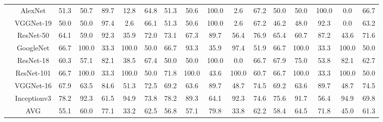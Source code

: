 \documentclass[12pt,italian]{article}
\begin{document}
\begin{tiny}
\begin{longtable}{lcccccccccccccccc}
& AlexNet & 51.3 & 50.7 & 89.7 & 12.8 & 64.8 & 51.3 & 50.6 & 100.0 &  2.6 & 67.2 & 50.0 & 50.0 & 100.0 &  0.0 & 66.7 \\ 
& VGGNet-19 & 50.0 & 50.0 & 97.4 &  2.6 & 66.1 & 51.3 & 50.6 & 100.0 &  2.6 & 67.2 & 46.2 & 48.0 & 92.3 &  0.0 & 63.2 \\ 
& ResNet-50 & 64.1 & 59.0 & 92.3 & 35.9 & 72.0 & 73.1 & 67.3 & 89.7 & 56.4 & 76.9 & 65.4 & 60.7 & 87.2 & 43.6 & 71.6 \\ 
& GoogleNet & 66.7 & 100.0 & 33.3 & 100.0 & 50.0 & 66.7 & 93.3 & 35.9 & 97.4 & 51.9 & 66.7 & 100.0 & 33.3 & 100.0 & 50.0 \\ 
& ResNet-18 & 60.3 & 57.1 & 82.1 & 38.5 & 67.4 & 50.0 & 50.0 & 100.0 &  0.0 & 66.7 & 67.9 & 75.0 & 53.8 & 82.1 & 62.7 \\ 
& ResNet-101 & 66.7 & 100.0 & 33.3 & 100.0 & 50.0 & 71.8 & 100.0 & 43.6 & 100.0 & 60.7 & 66.7 & 100.0 & 33.3 & 100.0 & 50.0 \\ 
& VGGNet-16 & 67.9 & 63.5 & 84.6 & 51.3 & 72.5 & 69.2 & 63.6 & 89.7 & 48.7 & 74.5 & 69.2 & 63.6 & 89.7 & 48.7 & 74.5 \\ 
& Inceptionv3 & 78.2 & 92.3 & 61.5 & 94.9 & 73.8 & 78.2 & 89.3 & 64.1 & 92.3 & 74.6 & 75.6 & 91.7 & 56.4 & 94.9 & 69.8 \\ 
\hline
& AVG & 55.1 & 60.0 & 77.1 & 33.2 & 62.5 & 56.8 & 57.1 & 79.8 & 33.8 & 62.2 & 58.4 & 64.5 & 71.8 & 45.0 & 61.3 \\ 
\hline
\bottomrule
\end{longtable} 

 \pagebreak 
\end{tiny} 
 
\end{document}
